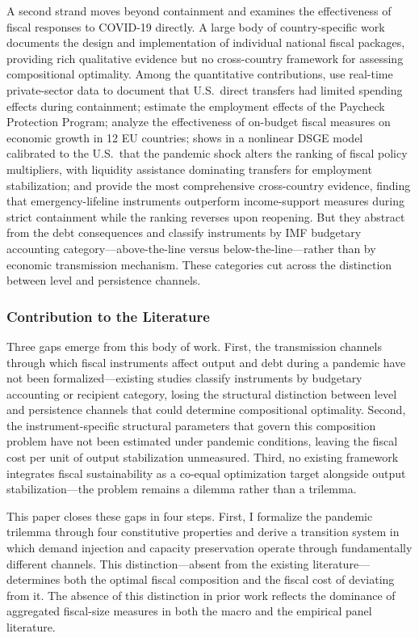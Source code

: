 \documentclass[12pt, a4paper]{article}
\begin{document}
A second strand moves beyond containment and examines the effectiveness of fiscal responses to COVID-19 directly. A large body of country-specific work documents the design and implementation of individual national fiscal packages, providing rich qualitative evidence but no cross-country framework for assessing compositional optimality. Among the quantitative contributions, \citet{chetty2020} use real-time private-sector data to document that U.S.\ direct transfers had limited spending effects during containment; \citet{Autor2022} estimate the employment effects of the Paycheck Protection Program; \citet{Pappa2022} analyze the effectiveness of on-budget fiscal measures on economic growth in 12 EU countries; \citet{fariaecastro2021} shows in a nonlinear DSGE model calibrated to the U.S.\ that the pandemic shock alters the ranking of fiscal policy multipliers, with liquidity assistance dominating transfers for employment stabilization; and \citet{deb2021} provide the most comprehensive cross-country evidence, finding that emergency-lifeline instruments outperform income-support measures during strict containment while the ranking reverses upon reopening. But they abstract from the debt consequences and classify instruments by IMF budgetary accounting category---above-the-line versus below-the-line---rather than by economic transmission mechanism. These categories cut across the distinction between level and persistence channels.

\subsubsection{Contribution to the Literature}

Three gaps emerge from this body of work. First, the transmission channels through which fiscal instruments affect output and debt during a pandemic have not been formalized---existing studies classify instruments by budgetary accounting or recipient category, losing the structural distinction between level and persistence channels that could determine compositional optimality. Second, the instrument-specific structural parameters that govern this composition problem have not been estimated under pandemic conditions, leaving the fiscal cost per unit of output stabilization unmeasured. Third, no existing framework integrates fiscal sustainability as a co-equal optimization target alongside output stabilization---the problem remains a dilemma rather than a trilemma.

This paper closes these gaps in four steps. First, I formalize the pandemic trilemma through four constitutive properties and derive a transition system in which demand injection and capacity preservation operate through fundamentally different channels. This distinction---absent from the existing literature---determines both the optimal fiscal composition and the fiscal cost of deviating from it. The absence of this distinction in prior work reflects the dominance of aggregated fiscal-size measures in both the macro and the empirical panel literature.
\end{document}
